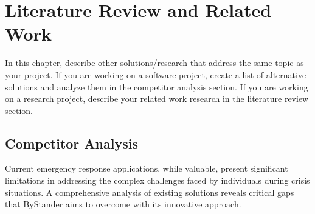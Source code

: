 \chapter{Literature Review and Related Work}
\label{chap:relatedworks}

In this chapter, describe other solutions/research that address the
same topic as your project. If you are working on a software project, create a
list of alternative solutions and analyze them in the competitor analysis section.
If you are working on a research project, describe your related work research in
the literature review section.

\section{Competitor Analysis}
\label{section:competitor-analysis}


Current emergency response applications, while valuable, present significant limitations in addressing the complex challenges faced 
by individuals during crisis situations. A comprehensive analysis of existing solutions reveals critical gaps that ByStander aims to 
overcome with its innovative approach.

